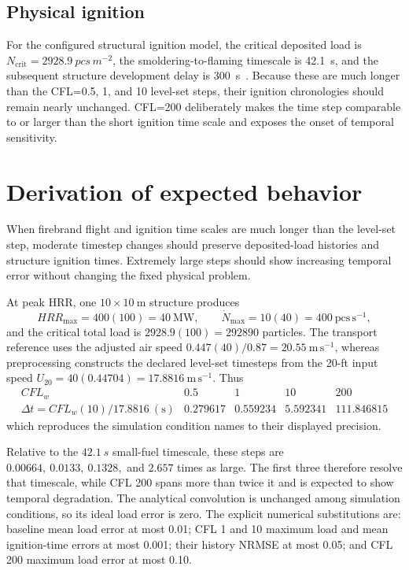\subsection{Physical ignition}

For the configured structural ignition model, the critical deposited load is
\(N_{\mathrm{crit}}=\SI{2928.9}{pcs\,m^{-2}}\), the
smoldering-to-flaming timescale is \SI{42.1}{s}, and the subsequent structure
development delay is \SI{300}{s}~\cite{Qin2025}. Because these are much longer
than the CFL=0.5, 1, and 10 level-set steps, their ignition chronologies should
remain nearly unchanged. CFL=200 deliberately makes the time step comparable
to or larger than the short ignition time scale and exposes the onset of
temporal sensitivity.

\section{Derivation of expected behavior}
When firebrand flight and ignition time scales are much longer than the level-set step, moderate timestep changes should preserve deposited-load histories and structure ignition times. Extremely large steps should show increasing temporal error without changing the fixed physical problem.

At peak HRR, one \(10\times10~\mathrm{m}\) structure produces
\[
 HRR_{\max}=400(100)=40~\mathrm{MW},\qquad
 \dot N_{\max}=10(40)=400~\mathrm{pcs\,s^{-1}},
\]
and the critical total load is
\(2928.9(100)=292890\) particles.  The transport reference uses the adjusted
air speed \(0.447(40)/0.87=20.55~\mathrm{m\,s^{-1}}\), whereas preprocessing
constructs the declared level-set timesteps from the 20-ft input speed
\(U_{20}=40(0.44704)=17.8816~\mathrm{m\,s^{-1}}\).  Thus
\[
\begin{array}{c|rrrr}
CFL_w&0.5&1&10&200\\\hline
\Delta t=CFL_w(10)/17.8816~(\mathrm{s})
&0.279617&0.559234&5.592341&111.846815
\end{array}
\]
which reproduces the simulation condition names to their displayed precision.

Relative to the \(\SI{42.1}{s}\) small-fuel timescale, these steps are
\(0.00664,\ 0.0133,\ 0.1328,\) and \(2.657\) times as large.  The first
three therefore resolve that timescale, while CFL 200 spans more than twice
it and is expected to show temporal degradation.  The analytical convolution
is unchanged among simulation conditions, so its ideal load error is zero.  The explicit
numerical substitutions are: baseline mean load error at most 0.01; CFL 1
and 10 maximum load and mean ignition-time errors at most 0.001; their
history NRMSE at most 0.05; and CFL 200 maximum load error at most 0.10.


